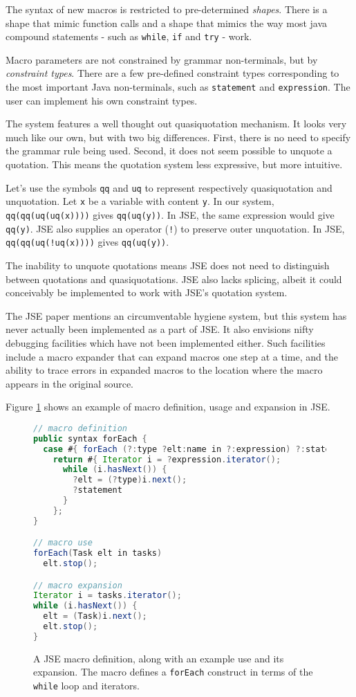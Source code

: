 The syntax of new macros is restricted to pre-determined \emph{shapes}. There is
a shape that mimic function calls and a shape that mimics the way most java
compound statements - such as \texttt{while}, \texttt{if} and \texttt{try} -
work.

Macro parameters are not constrained by grammar non-terminals, but by
\emph{constraint types}. There are a few pre-defined constraint types
corresponding to the most important Java non-terminals, such as
\texttt{statement} and \texttt{expression}.  The user can implement his own
constraint types.

The system features a well thought out quasiquotation mechanism. It looks very
much like our own, but with two big differences. First, there is no need to
specify the grammar rule being used. Second, it does not seem possible to
unquote a quotation. This means the quotation system less expressive, but more
intuitive.

Let's use the symbols \texttt{qq} and \texttt{uq} to represent respectively
quasiquotation and unquotation. Let \texttt{x} be a variable with content
\texttt{y}. In our system, \texttt{qq(qq(uq(uq(x))))} gives
\texttt{qq(uq(y))}. In JSE, the same expression would give \texttt{qq(y)}. JSE
also supplies an operator (\texttt{!})  \cite{jse_slides} to preserve outer
unquotation. In JSE, \texttt{qq(qq(uq(!uq(x))))} gives \texttt{qq(uq(y))}.

The inability to unquote quotations means JSE does not need to distinguish
between quotations and quasiquotations. JSE also lacks splicing, albeit it could
conceivably be implemented to work with JSE's quotation system.

The JSE paper \cite{JSE} mentions an circumventable hygiene system, but this
system has never actually been implemented as a part of JSE. It also envisions
nifty debugging facilities which have not been implemented either. Such
facilities include a macro expander that can expand macros one step at a time,
and the ability to trace errors in expanded macros to the location where the
macro appears in the original source.

Figure \ref{jse_example} shows an example of macro definition, usage and
expansion in JSE.

\begin{figure}[here]
\small
\begin{lstlisting}[language=Java, frame=single]
// macro definition
public syntax forEach {
  case #{ forEach (?:type ?elt:name in ?:expression) ?:statement }:
    return #{ Iterator i = ?expression.iterator();
      while (i.hasNext()) {
        ?elt = (?type)i.next();
        ?statement
      }
    };
}

// macro use
forEach(Task elt in tasks)
  elt.stop();

// macro expansion
Iterator i = tasks.iterator();
while (i.hasNext()) {
  elt = (Task)i.next();
  elt.stop();
}
\end{lstlisting}
\caption{A JSE macro definition, along with an example use and its
  expansion. The macro defines a \texttt{forEach} construct in terms of the
  \texttt{while} loop and iterators.}
\label{jse_example}
\end{figure}

